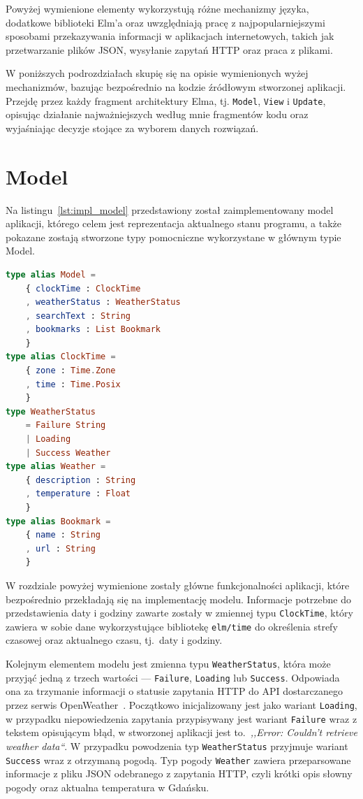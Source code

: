 \documentclass[twoside,a4paper]{report}
\begin{document}
Powyżej wymienione elementy wykorzystują różne mechanizmy języka, dodatkowe biblioteki Elm'a oraz uwzględniają pracę z najpopularniejszymi sposobami przekazywania informacji w aplikacjach internetowych, takich jak przetwarzanie plików JSON, wysyłanie zapytań HTTP oraz praca z plikami.

W poniższych podrozdziałach skupię się na opisie wymienionych wyżej mechanizmów, bazując bezpośrednio na kodzie źródłowym stworzonej aplikacji.
Przejdę przez każdy fragment architektury Elma, tj. \texttt{Model}, \texttt{View} i \texttt{Update}, opisując działanie najważniejszych według mnie fragmentów kodu oraz wyjaśniając decyzje stojące za wyborem danych rozwiązań.

\section{Model}
Na listingu~\ref{lst:impl_model} przedstawiony został zaimplementowany model aplikacji, którego celem jest reprezentacja aktualnego stanu programu, a także pokazane zostają stworzone typy pomocniczne wykorzystane w głównym typie Model.

\begin{lstlisting}[caption={\textit{}Pełen model aplikacji},label={lst:impl_model},language={Elm}]
type alias Model =
    { clockTime : ClockTime
    , weatherStatus : WeatherStatus
    , searchText : String
    , bookmarks : List Bookmark
    }
type alias ClockTime =
    { zone : Time.Zone
    , time : Time.Posix
    }
type WeatherStatus
    = Failure String
    | Loading
    | Success Weather
type alias Weather =
    { description : String
    , temperature : Float
    }
type alias Bookmark =
    { name : String
    , url : String
    }
\end{lstlisting}

W rozdziale powyżej wymienione zostały główne funkcjonalności aplikacji, które bezpośrednio przekładają się na implementację modelu.
Informacje potrzebne do przedstawienia daty i godziny zawarte zostały w zmiennej typu \texttt{ClockTime}, który zawiera w sobie dane wykorzystujące bibliotekę \texttt{elm/time} do określenia strefy czasowej oraz aktualnego czasu, tj.~daty i godziny.

Kolejnym elementem modelu jest zmienna typu \texttt{WeatherStatus}, która może przyjąć jedną z trzech wartości --- \texttt{Failure}, \texttt{Loading} lub \texttt{Success}.
Odpowiada ona za trzymanie informacji o statusie zapytania HTTP do API dostarczanego przez serwis OpenWeather~\cite{openweather}.
Początkowo inicjalizowany jest jako wariant \texttt{Loading}, w przypadku niepowiedzenia zapytania przypisywany jest wariant \texttt{Failure} wraz z tekstem opisującym błąd, w stworzonej aplikacji jest to.~\textit{,,Error: Couldn't retrieve weather data``}.
W przypadku powodzenia typ \texttt{WeatherStatus} przyjmuje wariant \texttt{Success} wraz z otrzymaną pogodą.
Typ pogody \texttt{Weather} zawiera przeparsowane informacje z pliku JSON odebranego z zapytania HTTP, czyli krótki opis słowny pogody oraz aktualna temperatura w Gdańsku.
\end{document}
